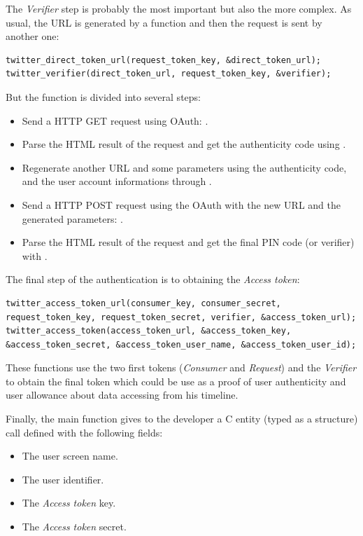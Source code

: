 The \textit{Verifier} step is probably the most important but also the more complex. As usual, the URL is generated by a function and then the request is sent by another one:
\begin{lstlisting}
twitter_direct_token_url(request_token_key, &direct_token_url);
twitter_verifier(direct_token_url, request_token_key, &verifier);
\end{lstlisting}
But the  function is divided into several steps:
\begin{itemize}
\item Send a HTTP GET request using OAuth: .
\item Parse the HTML result of the request and get the authenticity code using .
\item Regenerate another URL and some parameters using the authenticity code, and the user account informations through .
\item Send a HTTP POST request using the OAuth with the new URL and the generated parameters: .
\item Parse the HTML result of the request and get the final PIN code (or verifier) with .
\end{itemize}

The final step of the authentication is to obtaining the \textit{Access token}:
\begin{lstlisting}
twitter_access_token_url(consumer_key, consumer_secret, request_token_key, request_token_secret, verifier, &access_token_url);
twitter_access_token(access_token_url, &access_token_key, &access_token_secret, &access_token_user_name, &access_token_user_id);
\end{lstlisting}
These functions use the two first tokens (\textit{Consumer} and \textit{Request}) and the \textit{Verifier} to obtain the final token which could be use as a proof of user authenticity and user allowance about data accessing from his timeline.

Finally, the main function gives to the developer a C entity (typed as a structure) call  defined with the following fields:
\begin{itemize}
\item The user screen name.
\item The user identifier.
\item The \textit{Access token} key.
\item The \textit{Access token} secret.
\end{itemize}


